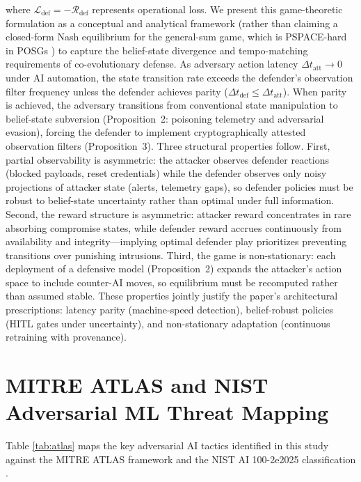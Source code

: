\documentclass[conference,10pt,twocolumn,a4paper]{IEEEtran}
\begin{document}
where $\mathcal{L}_{\mathrm{def}} = -\mathcal{R}_{\mathrm{def}}$ represents operational loss.
We present this game-theoretic formulation as a conceptual and analytical framework (rather than claiming a closed-form Nash equilibrium for the general-sum game, which is PSPACE-hard in POSGs \cite{alpcan2010network, manshaei2013game}) to capture the belief-state divergence and tempo-matching requirements of co-evolutionary defense. As adversary action latency $\Delta t_{\mathrm{att}} \to 0$ under AI automation, the state transition rate exceeds the defender's observation filter frequency unless the defender achieves parity ($\Delta t_{\mathrm{def}} \le \Delta t_{\mathrm{att}}$). When parity is achieved, the adversary transitions from conventional state manipulation to belief-state subversion (Proposition~2: poisoning telemetry and adversarial evasion), forcing the defender to implement cryptographically attested observation filters (Proposition~3). Three structural properties follow. First, partial observability is asymmetric: the attacker observes defender reactions (blocked payloads, reset credentials) while the defender observes only noisy projections of attacker state (alerts, telemetry gaps), so defender policies must be robust to belief-state uncertainty rather than optimal under full information. Second, the reward structure is asymmetric: attacker reward concentrates in rare absorbing compromise states, while defender reward accrues continuously from availability and integrity---implying optimal defender play prioritizes preventing transitions over punishing intrusions. Third, the game is non-stationary: each deployment of a defensive model (Proposition~2) expands the attacker's action space to include counter-AI moves, so equilibrium must be recomputed rather than assumed stable. These properties jointly justify the paper's architectural prescriptions: latency parity (machine-speed detection), belief-robust policies (HITL gates under uncertainty), and non-stationary adaptation (continuous retraining with provenance).

\section{MITRE ATLAS and NIST Adversarial ML Threat Mapping}
\label{app:b}
Table \ref{tab:atlas} maps the key adversarial AI tactics identified in this study against the MITRE ATLAS framework and the NIST AI 100-2e2025 classification \cite{nist_sp_ai_100_2e2025}.
\end{document}

